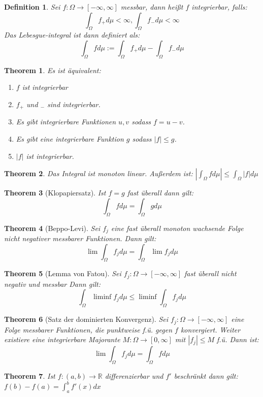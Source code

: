 \documentclass[10pt,a4paper]{article}
\newtheorem{theorem}{Theorem}
\newtheorem{definition}{Definition}
\begin{document}
\begin{definition}
	Sei $f: \Omega \to [-\infty, \infty]$ messbar, dann heißt $f$ integrierbar, falls:
	$$\int_\Omega f_+ d\mu < \infty, \int_\Omega f_- d\mu < \infty$$
	Das Lebesgue-integral ist dann definiert als:
	$$\int_\Omega f d\mu := \int_\Omega f_+ d\mu - \int_\Omega f_- d\mu$$
\end{definition}
\begin{theorem}
	Es ist äquivalent:
	\begin{enumerate}
		\item $f$ ist integrierbar
		\item $f_+$ und $_-$ sind integrierbar.
		\item Es gibt integrierbare Funktionen $u, v$ sodass $f = u-v$.
		\item Es gibt eine integrierbare Funktion $g$ sodass $|f| \leq g$.
		\item $|f|$ ist integrierbar.
	\end{enumerate}
\end{theorem}
\begin{theorem}
	Das Integral ist monoton linear. Außerdem ist: $|\int_\Omega f d\mu| \leq \int_\Omega |f| d\mu$
\end{theorem}
\begin{theorem}[Klopapiersatz]
	Ist $f= g$ fast überall dann gilt: $$\int_\Omega f d\mu = \int_\Omega g d\mu$$
\end{theorem}
\begin{theorem}[Beppo-Levi]
	Sei $f_j$ eine fast überall monoton wachsende Folge nicht negativer messbarer Funktionen. Dann gilt:
	$$\lim \int_\Omega f_j d\mu = \int_\Omega\lim f_j d\mu$$
\end{theorem}
\begin{theorem}[Lemma von Fatou]
	Sei $f_j: \Omega \to [-\infty, \infty]$ fast überall nicht negativ und messbar Dann gilt:
	$$\int_\Omega \liminf f_j d\mu \leq \liminf \int_\Omega f_jd \mu$$
\end{theorem}
\begin{theorem}[Satz der dominierten Konvergenz]
	Sei $f_j: \Omega \to [-\infty, \infty]$ eine Folge messbarer Funktionen, die punktweise f.ü. gegen $f$ konvergiert. Weiter existiere eine integrierbare Majorante $M: \Omega \to[0, \infty]$ mit $|f_j| \leq M$	f.ü. Dann ist: 
	$$\lim\int_\Omega f_j d\mu = \int_\Omega f d\mu$$
\end{theorem}
\begin{theorem}
	Ist $f: (a, b) \to \mathbb{R}$ differenzierbar und $f'$ beschränkt dann gilt: $f(b) - f(a) = \int_{a}^{b}f'(x)dx$
\end{theorem}
\end{document}
